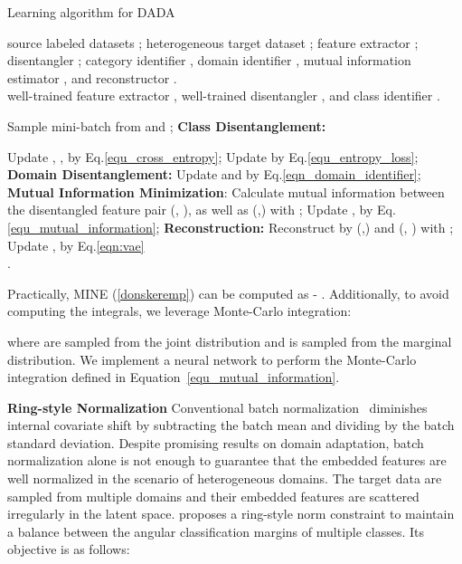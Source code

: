 \documentclass{article}
\begin{document}
\begin{algorithm}[t]			
	\caption{Learning algorithm for DADA} \label{alg_DADA}
	\begin{small}
		\hspace*{0.02in}{\bf Input:} source labeled datasets ; heterogeneous target dataset ; feature extractor ; disentangler ; category identifier , domain identifier , mutual information estimator , and reconstructor .\\
		\hspace*{0.02in}{\bf Output:} well-trained feature extractor , well-trained disentangler , and class identifier .
		\begin{algorithmic}[1]
			\State Sample mini-batch from  and ;
			\State \textbf{Class Disentanglement:}
			
			\State Update , ,  by Eq.\ref{equ_cross_entropy};
			\State Update  by Eq.\ref{equ_entropy_loss};
			\EndFor
			\State \textbf{Domain Disentanglement:}
			\State Update  and  by Eq.\ref{eqn_domain_identifier};
			\State \textbf{Mutual Information Minimization}:
			\State Calculate mutual information between the disentangled feature pair (, ), as well as (,) with ;
			\State Update ,  by Eq.\ref{equ_mutual_information};
			\State \textbf{Reconstruction:}
			\State Reconstruct  by (,) and (, ) with ;
			\State Update ,  by Eq.\ref{eqn:vae}
			\EndWhile \\
			\Return .
		\end{algorithmic}
	\end{small}
\end{algorithm}

 
Practically, MINE (\ref{donskeremp}) can be computed as  - . Additionally, to avoid computing the integrals, we leverage Monte-Carlo integration:

 where  are sampled from the joint distribution and  is sampled from the marginal distribution. We implement a neural network to perform the Monte-Carlo integration defined in Equation~\ref{equ_mutual_information}.





\textbf{Ring-style Normalization} Conventional batch normalization~\cite{batch_normalization} diminishes internal covariate shift by subtracting the batch mean and dividing by the batch standard deviation. Despite promising results on domain adaptation, batch normalization alone is not enough to guarantee that the embedded features are well normalized in the scenario of heterogeneous domains. The target data are sampled from multiple domains and their embedded features are scattered irregularly in the latent space. \citet{ringloss} proposes a ring-style norm constraint to maintain a balance between the angular classification margins of multiple classes. Its objective is as follows:
\end{document}
